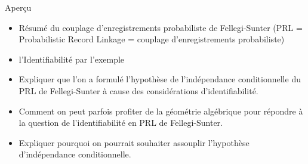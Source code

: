 
\begin{frame}{\vskip 0.1cm \huge Aper\c{c}u}

\vskip -0.10cm

\small

\begin{itemize}
\pause\item
	R\'esum\'e du couplage d'enregistrements probabiliste de Fellegi-Sunter
	\vskip -0.1cm
	{\scriptsize(PRL = Probabilistic Record Linkage = couplage d'enregistrements probabiliste)}
	\vskip 0.35cm
\pause\item
	l'{\color{customRed}Identifiabilit\'e} par l'exemple
	\vskip 0.35cm
\pause\item
	Expliquer que l'on a formul\'e l'hypoth\`ese de l'{\color{customRed}ind\'ependance conditionnelle}
	du PRL de Fellegi-Sunter \`a cause des consid\'erations d'identifiabilit\'e.
	\vskip 0.35cm
\pause\item
	Comment on peut parfois profiter de la {\color{customRed}g\'eom\'etrie alg\'ebrique}
	pour r\'epondre \`a la question de l'identifiabilit\'e en PRL de Fellegi-Sunter.
	\vskip 0.35cm
\pause\item
	Expliquer pourquoi on pourrait souhaiter {\color{customRed}assouplir} l'hypoth\`ese
	d'ind\'ependance conditionnelle.
\end{itemize}

\end{frame}
\normalsize

